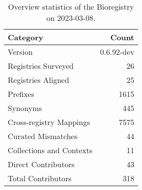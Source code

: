 \begin{table}
\centering
\caption{Overview statistics of the Bioregistry on 2023-03-08.}
\label{tab:bioregistry-summary}
\begin{tabular}{lr}
\toprule
                Category &      Count \\
\midrule
                 Version & 0.6.92-dev \\
     Registries Surveyed &         26 \\
      Registries Aligned &         25 \\
                Prefixes &       1615 \\
                Synonyms &        445 \\
 Cross-registry Mappings &       7575 \\
      Curated Mismatches &         44 \\
Collections and Contexts &         11 \\
     Direct Contributors &         43 \\
      Total Contributors &        318 \\
\bottomrule
\end{tabular}
\end{table}
